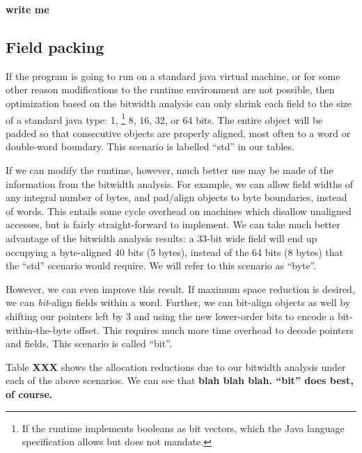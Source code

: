 \documentclass[preprint]{acmconf}
\begin{document}
{\bf write me}

\subsection{Field packing}
If the program is going to run on a standard java virtual machine, or
for some other reason modifications to the runtime environment are not
possible, then optimization based on the bitwidth analysis can only
shrink each field to the size of a standard java type: 1,%
\footnote{If the runtime implements booleans as bit vectors, which the
  Java language specification allows but does not mandate.}
8, 16, 32, or 64 bits.  The entire object will be padded so that
consecutive objects are properly aligned, most often to a word or
double-word boundary.  This scenario is labelled ``std'' in our tables.

If we can modify the runtime, however, much better use may be made of
the information from the bitwidth analysis.  For example, we can
allow field widths of any integral number of bytes, and pad/align
objects to byte boundaries, instead of words.  This entails some
cycle overhead on machines which disallow unaligned accesses, but is
fairly straight-forward to implement.  We can take much better
advantage of the bitwidth analysis results: a 33-bit wide field will
end up occupying a byte-aligned 40 bits (5 bytes), instead of the 64
bits (8 bytes) that the ``std'' scenario would require.  We will refer
to this scenario as ``byte''.

However, we can even improve this result.  If maximum space reduction
is desired, we can {\it bit}-align fields within a word.  Further, we
can bit-align objects as well by shifting our pointers left by 3 and
using the new lower-order bits to encode a bit-within-the-byte offset.
This requires much more time overhead to decode pointers and fields.
This scenario is called ``bit''.

Table {\bf XXX} shows the allocation reductions due to our bitwidth
analysis under each of the above scenarios.  We can see that {\bf blah
  blah blah.  ``bit'' does best, of course.}
\end{document}
